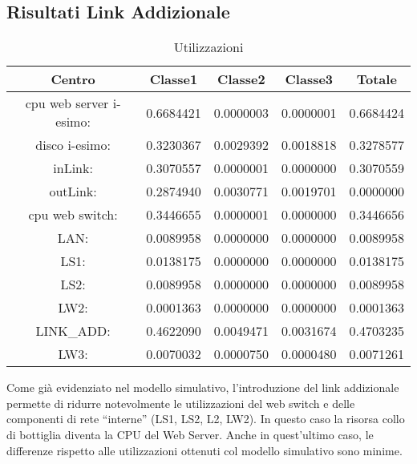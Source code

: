 \subsection{Risultati Link Addizionale}
\begin{table}[H]
\begin{center}
\begin{tabular}{||c|c|c|c|c||}
\hline
Centro &Classe1 &Classe2 &Classe3 &Totale\\
\hline
\hline
 cpu web server i-esimo: 	&0.6684421	&0.0000003	&0.0000001	&0.6684424	\\\hline
 disco i-esimo: 	&0.3230367	&0.0029392	&0.0018818	&0.3278577	\\\hline
 inLink: 	&0.3070557	&0.0000001	&0.0000000	&0.3070559	\\\hline
 outLink: 	&0.2874940	&0.0030771	&0.0019701	&0.0000000	\\\hline
 cpu web switch: 	&0.3446655	&0.0000001	&0.0000000	&0.3446656	\\\hline
 LAN: 	&0.0089958	&0.0000000	&0.0000000	&0.0089958	\\\hline
 LS1: 	&0.0138175	&0.0000000	&0.0000000	&0.0138175	\\\hline
 LS2:	&0.0089958	&0.0000000	&0.0000000	&0.0089958	\\\hline
 LW2: 	&0.0001363	&0.0000000	&0.0000000	&0.0001363	\\\hline
 LINK_ADD: 	&0.4622090	&0.0049471	&0.0031674	&0.4703235	\\\hline
 LW3: 	&0.0070032	&0.0000750	&0.0000480	&0.0071261	\\\hline
\end{tabular}
\end{center}
\caption{Utilizzazioni}
\label{utilizzazioni}
\end{table}
Come già evidenziato nel modello simulativo, l'introduzione del link addizionale permette di ridurre notevolmente le utilizzazioni del web switch e delle componenti di rete “interne” (LS1, LS2, L2, LW2). In questo caso la risorsa collo di bottiglia diventa la CPU del Web Server. Anche in quest'ultimo caso, le differenze rispetto alle utilizzazioni  ottenuti col modello simulativo sono minime.
